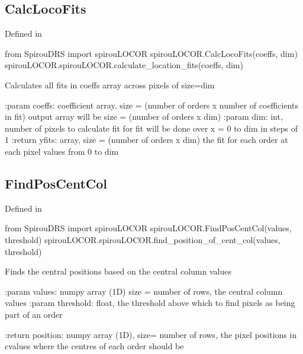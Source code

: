 \noindent\begin{minipage}{\textwidth}
\subsection{CalcLocoFits}

Defined in \spirouLOCOR{}

\begin{pythonbox}
from SpirouDRS import spirouLOCOR
spirouLOCOR.CalcLocoFits(coeffs, dim)
spirouLOCOR.spirouLOCOR.calculate_location_fits(coeffs, dim)
\end{pythonbox}

\begin{pythondocstring}
Calculates all fits in coeffs array across pixels of size=dim

:param coeffs: coefficient array,
               size = (number of orders x number of coefficients in fit)
               output array will be size = (number of orders x dim)
:param dim: int, number of pixels to calculate fit for
            fit will be done over x = 0 to dim in steps of 1
:return yfits: array,
               size = (number of orders x dim)
               the fit for each order at each pixel values from 0 to dim
\end{pythondocstring}
\end{minipage}

\noindent\begin{minipage}{\textwidth}
\subsection{FindPosCentCol}

Defined in \spirouLOCOR{}

\begin{pythonbox}
from SpirouDRS import spirouLOCOR
spirouLOCOR.FindPosCentCol(values, threshold)
spirouLOCOR.spirouLOCOR.find_position_of_cent_col(values, threshold)
\end{pythonbox}

\begin{pythondocstring}
Finds the central positions based on the central column values

:param values: numpy array (1D) size = number of rows,
                the central column values
:param threshold: float, the threshold above which to find pixels as being
                  part of an order

:return position: numpy array (1D), size= number of rows,
                  the pixel positions in cvalues where the centres of each
                  order should be
\end{pythondocstring}
\end{minipage}

